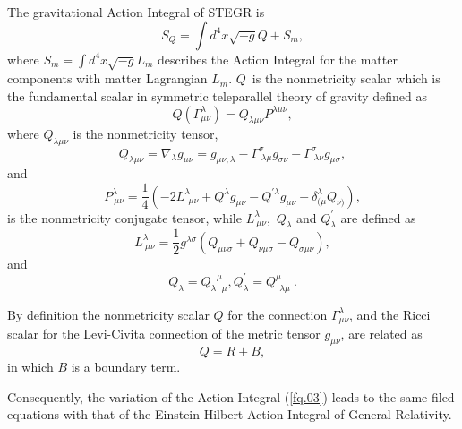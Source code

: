 \documentclass[onecolumn,superscriptaddress,secnumarabic,nobibnotes,aps,prd,nofootinbib,altaffilletter,11pt]{revtex4}
\begin{document}
The gravitational Action Integral of STEGR is \cite{Nester:1998mp}%
\begin{equation}
S_{Q}=\int d^{4}x\sqrt{-g}Q+S_{m},  \label{fq.03}
\end{equation}%
where $S_{m}=\int d^{4}x\sqrt{-g}L_{m}$ describes the Action Integral for
the matter components with matter Lagrangian $L_{m}$. $Q$\ is the nonmetricity scalar which is the fundamental scalar in
symmetric teleparallel theory of gravity defined as \cite{revh} 
\begin{equation}
Q\left( \Gamma _{\mu \nu }^{\lambda }\right) =Q_{\lambda \mu \nu }P^{\lambda
\mu \nu },  \label{fq.04}
\end{equation}%
where $Q_{\lambda \mu \nu }$ is the nonmetricity tensor, 
\begin{equation}
Q_{\lambda \mu \nu }= \nabla _{\lambda
}g_{\mu \nu } = g_{\mu \nu ,\lambda }-\Gamma _{\;\lambda \mu }^{\sigma
}g_{\sigma \nu }-\Gamma _{\;\lambda \nu }^{\sigma }g_{\mu \sigma },
\label{fq.05}
\end{equation}%
and%
\begin{equation}
P_{~\mu \nu }^{\lambda }=\frac{1}{4}\left( -2L_{~~\mu \nu }^{\lambda
}+Q^{\lambda }g_{\mu \nu }-Q^{\prime \lambda }g_{\mu \nu }-\delta _{(\mu
}^{\lambda }Q_{\nu )}\right) ,  \label{fq.06}
\end{equation}%
is the nonmetricity conjugate tensor, while $L_{~\mu \nu }^{\lambda }$,~$%
Q_{\lambda }$ and $Q_{\lambda }^{\prime }$ are defined as \cite{revh} 
\begin{equation}
L_{~\mu \nu }^{\lambda }=\frac{1}{2}g^{\lambda \sigma }\left( Q_{\mu \nu
\sigma }+Q_{\nu \mu \sigma }-Q_{\sigma \mu \nu }\right) ,  \label{fq.07}
\end{equation}%
and%
\begin{equation}
Q_{\lambda }=Q_{\lambda ~~~\mu }^{~~~\mu },Q_{\lambda }^{\prime
}=Q_{~~\lambda \mu }^{\mu }~.  \label{fq.08}
\end{equation}

By definition the nonmetricity scalar $Q$ for the connection $\Gamma _{\mu
\nu }^{\lambda }$, and the Ricci scalar for the Levi-Civita connection of
the metric tensor $g_{\mu \nu }$, are related as \cite{revh}%
\begin{equation}
Q=R+B,  \label{fq.09}
\end{equation}%
in which $B$ is a boundary term. \ 

Consequently, the variation of the Action Integral (\ref{fq.03}) leads to
the same filed equations with that of the Einstein-Hilbert Action Integral
of General Relativity.
\end{document}

